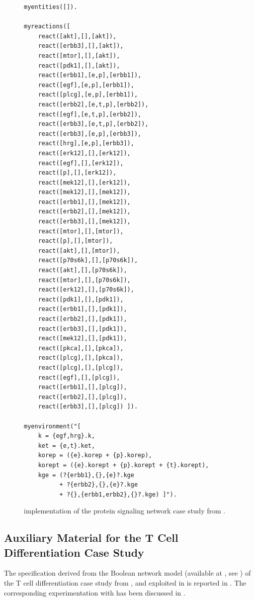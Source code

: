 \begin{figure}[t]
\begin{minipage}{0.9\linewidth}
\footnotesize
\begin{verbatim}
myentities([]).

myreactions([
    react([akt],[],[akt]),
    react([erbb3],[],[akt]),
    react([mtor],[],[akt]),
    react([pdk1],[],[akt]),
    react([erbb1],[e,p],[erbb1]),
    react([egf],[e,p],[erbb1]),
    react([plcg],[e,p],[erbb1]),
    react([erbb2],[e,t,p],[erbb2]),
    react([egf],[e,t,p],[erbb2]),
    react([erbb3],[e,t,p],[erbb2]),
    react([erbb3],[e,p],[erbb3]),
    react([hrg],[e,p],[erbb3]),
    react([erk12],[],[erk12]),
    react([egf],[],[erk12]),
    react([p],[],[erk12]),
    react([mek12],[],[erk12]),
    react([mek12],[],[mek12]),
    react([erbb1],[],[mek12]),
    react([erbb2],[],[mek12]),
    react([erbb3],[],[mek12]),
    react([mtor],[],[mtor]),
    react([p],[],[mtor]),
    react([akt],[],[mtor]),
    react([p70s6k],[],[p70s6k]),
    react([akt],[],[p70s6k]),
    react([mtor],[],[p70s6k]),
    react([erk12],[],[p70s6k]),
    react([pdk1],[],[pdk1]),
    react([erbb1],[],[pdk1]),
    react([erbb2],[],[pdk1]),
    react([erbb3],[],[pdk1]),
    react([mek12],[],[pdk1]),
    react([pkca],[],[pkca]),
    react([plcg],[],[pkca]),
    react([plcg],[],[plcg]),
    react([egf],[],[plcg]),
    react([erbb1],[],[plcg]),
    react([erbb2],[],[plcg]),
    react([erbb3],[],[plcg]) ]).

myenvironment("[
    k = {egf,hrg}.k,
    ket = {e,t}.ket,
    korep = ({e}.korep + {p}.korep),
    korept = ({e}.korept + {p}.korept + {t}.korept),
    kge = (?{erbb1},{},{e}?.kge 
          + ?{erbb2},{},{e}?.kge 
          + ?{},{erbb1,erbb2},{}?.kge) ]").

\end{verbatim}
\end{minipage}
\caption{\BioResolve implementation of the protein signaling network case study from .}
\label{fig:bioresolve:psn}
\end{figure}

\subsection{Auxiliary Material for the T Cell Differentiation Case Study}

The \BioResolve specification derived from the Boolean network model (available at \cite{ModelCellCollective}, see ) of the T cell differentiation case study from \cite{puniya2018mechanistic}, and exploited in \cite{datamod2023} is reported in . The corresponding experimentation with \GROOVE has been discussed in .




